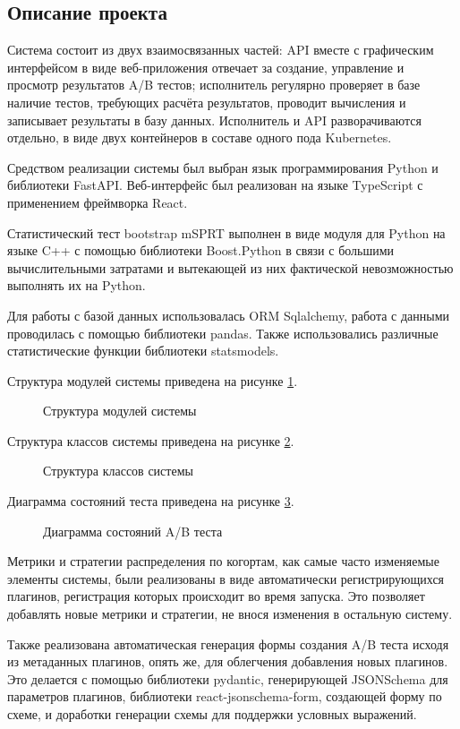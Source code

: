 \documentclass[../document.tex]{subfiles}
\begin{document}
	\subsection{Описание проекта}
	\par Система состоит из двух взаимосвязанных частей: API вместе с графическим интерфейсом в виде веб-приложения отвечает за создание, управление и просмотр результатов A/B тестов; исполнитель регулярно проверяет в базе наличие тестов, требующих расчёта результатов, проводит вычисления и записывает результаты в базу данных. Исполнитель и API разворачиваются отдельно, в виде двух контейнеров в составе одного пода Kubernetes.
	\par Средством реализации системы был выбран язык программирования Python и библиотеки FastAPI. Веб-интерфейс был реализован на языке TypeScript с применением фреймворка React.
	\par Статистический тест bootstrap mSPRT выполнен в виде модуля для Python на языке C++ с помощью библиотеки Boost.Python в связи с большими вычислительными затратами и вытекающей из них фактической невозможностью выполнять их на Python.
	\par Для работы с базой данных использовалась ORM Sqlalchemy, работа с данными проводилась с помощью библиотеки pandas. Также использовались различные статистические функции библиотеки statsmodels.
	\par Структура модулей системы приведена на рисунке \ref{image:module_plot}.
	\begin{figure}[H]
		\caption{\label{image:module_plot}Структура модулей системы}
	\end{figure}
	\par Структура классов системы приведена на рисунке \ref{image:class_plot}.
	\begin{figure}[H]
		\caption{\label{image:class_plot}Структура классов системы}
	\end{figure}
	\par Диаграмма состояний теста приведена на рисунке \ref{image:test_state_plot}.
	\begin{figure}[H]
		\caption{\label{image:test_state_plot}Диаграмма состояний A/B теста}
	\end{figure}
	\par Метрики и стратегии распределения по когортам, как самые часто изменяемые элементы системы, были реализованы в виде автоматически регистрирующихся плагинов, регистрация которых происходит во время запуска. Это позволяет добавлять новые метрики и стратегии, не внося изменения в остальную систему.
	\par Также реализована автоматическая генерация формы создания A/B теста исходя из метаданных плагинов, опять же, для облегчения добавления новых плагинов. Это делается с помощью библиотеки pydantic, генерирующей JSONSchema для параметров плагинов, библиотеки react-jsonschema-form, создающей форму по схеме, и доработки генерации схемы для поддержки условных выражений.
\end{document}
